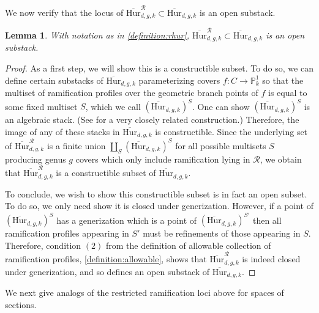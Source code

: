 \documentclass[12 pt]{amsart}
\theoremstyle{plain}
\newtheorem{lemma}[theorem]{Lemma}
\theoremstyle{definition}
\theoremstyle{remark}
\numberwithin{equation}{section}
\newcommand\bp{\mathbb P}
\newcommand\bighurg[3]{\overline{\mathrm{Hur}}_{#1,#2, #3}} %
\newcommand\bigrhur[4]{\overline{\mathrm{Hur}}_{#1,#2, #3}^{#4}} %
\begin{document}
We now verify that the locus of 
$\bigrhur d g k {\mathcal R} \subset \bighurg d g k$ 
is an open substack.
\begin{lemma}
	\label{lemma:restricted-ramification-is-open}
	With notation as in \autoref{definition:rhur},
	$\bigrhur d g k {\mathcal R} \subset \bighurg d g k$ is an open substack.
\end{lemma}
\begin{proof}
	As a first step, we will show this is a constructible subset.
	To do so, we can define certain substacks of
	$\bighurg d g k$ parameterizing covers $f: C \to \bp^1_k$ so that the
	multiset of ramification profiles over the geometric branch points of $f$ is equal
	to some
	fixed multiset $S$, which we call
	$(\bighurg d g k)^S$.
	One can show 
	$(\bighurg d g k)^S$
	is an algebraic stack. (See \cite[Thm.
		6.6.6]{bertinR:champs-de-hurwitz} for a very closely related
	construction.) 
	Therefore, the image of any of these stacks in
	$\bighurg d g k$ is constructible.
	Since the underlying set of $\bigrhur d g k {\mathcal R}$ is a finite
	union $\coprod_S (\bighurg d g k)^S$ for all possible multisets $S$
	producing genus $g$ covers
	which only include ramification lying in $\mathcal R$,
	we obtain that $\bigrhur d g k {\mathcal R}$ is a constructible subset
	of $\bighurg d g k$.

	To conclude, we wish to show this constructible subset is in fact an
	open subset. To do so, we only need show it is closed under
	generization.
	However, if a point of $(\bighurg d g k)^S$ has a generization which is
	a point of $(\bighurg d g k)^{S'}$ then all ramification profiles
	appearing in $S'$ must be refinements of those appearing in $S$.
	Therefore, condition $(2)$ from the definition of allowable 
	collection of ramification profiles,
	\autoref{definition:allowable},
	shows that $\bigrhur d g k {\mathcal R}$ is indeed closed under
	generization, and so defines an open substack of $\bighurg d g k$.
\end{proof}

We next give analogs of the restricted ramification loci above for spaces of
sections.
\end{document}
